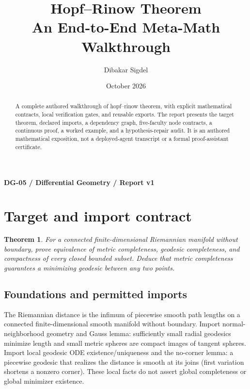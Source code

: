 \documentclass[preprint,12pt,aps,pra,showkeys,amsmath,amssymb,superscriptaddress,floatfix]{revtex4-2}
\newtheorem{theorem}{Theorem}[section]
\theoremstyle{definition}
\theoremstyle{remark}
\begin{document}
\title{Hopf--Rinow Theorem\\[4pt]\large An End-to-End Meta-Math Walkthrough}

\author{Dibakar Sigdel}


\date{October 2026}

\begin{abstract}

A complete authored walkthrough of hopf--rinow theorem, with explicit
mathematical contracts, local verification gates, and reusable exports.
The report presents the target theorem, declared imports, a dependency
graph, five-faculty node contracts, a continuous proof, a worked
example, and a hypothesis-repair audit. It is an authored mathematical
exposition, not a deployed-agent transcript or a formal proof-assistant
certificate.

\end{abstract}\maketitle\linespread{1.12}\selectfont

\noindent\textbf{DG-05 / Differential Geometry / Report v1}

\section{Target and import contract}

\begin{theorem}

For a connected finite-dimensional Riemannian manifold without boundary,
prove equivalence of metric completeness, geodesic completeness, and
compactness of every closed bounded subset. Deduce that metric
completeness guarantees a minimizing geodesic between any two points.

\end{theorem}

\subsection{Foundations and permitted imports}

The Riemannian distance is the infimum of piecewise smooth path lengths
on a connected finite-dimensional smooth manifold without boundary.
Import normal-neighborhood geometry and Gauss lemma: sufficiently small
radial geodesics minimize length and small metric spheres are compact
images of tangent spheres. Import local geodesic ODE
existence/uniqueness and the no-corner lemma: a piecewise geodesic that
realizes the distance is smooth at its joins (first variation shortens a
nonzero corner). These local facts do not assert global completeness or
global minimizer existence.
\end{document}
